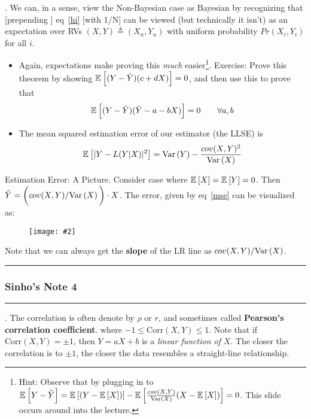 \documentclass[12pt]{article}
\newcommand\myfig[2][0.3\textwidth]{\begin{figure}[h!]\centering\texttt{[image: \#2]}\end{figure}}
\newcommand{\myspace}{\vspace{2\bigskipamount}}
\newcommand\p{\Needspace{12\baselineskip} \noindent}
\begin{document}
\myspace 
\p {}. We can, in a sense, view the Non-Bayesian case as Bayesian by recognizing that [prepending ] eq~\ref{hi} [with 1/N] can be viewed (but technically it isn't) as an expectation over RVs $(X, Y) \triangleq (X_n, Y_n)$ with uniform probability $Pr(X_i, Y_i)$ for all $i$. 
\begin{itemize}
	\item \Theorem[Consider two RVs $X, Y$ with joint $P(X = x, Y = y)$. Then]
	Again, expectations make proving this \emph{much} easier\footnote{Hint: Observe that by plugging in to $\mathbb{E}_{}\left[Y - \hat Y\right] = \mathbb{E}_{}\left[(Y - \mathbb{E}_{}\left[X\right])\right] - \mathbb{E}_{}\left[\frac{cov(X, Y)}{\text{Var}\left(X \right)} (X - \mathbb{E}_{}\left[X\right])\right] = 0$. This slide occurs around \purple{[34:00]} into the lecture. }. Exercise: Prove this theorem by showing $\mathbb{E}_{}\left[(Y - \hat Y)(c + dX)\right] = 0$, and then use this to prove that 
	\begin{align}
		\mathbb{E}_{}\left[(Y - \hat Y)(\hat Y - a - bX)\right] = 0 \qquad \forall a, b
	\end{align} 
	
	
	\item The mean squared estimation error of our estimator (the LLSE) is 
	\begin{align}
		\mathbb{E}_{}\left[ |Y - L(Y|X)|^2 \right] = \text{Var}\left(Y \right) - \frac{cov(X, Y)^2}{\text{Var}\left(X \right)} \label{mse}
	\end{align}
\end{itemize}

\myspace
\p Estimation Error: A Picture. Consider case where $\mathbb{E}_{}\left[X\right] = \mathbb{E}_{}\left[Y\right] = 0$. Then $\hat Y =\bigg( cov(X, Y)/\text{Var}\left(X \right)\bigg) \cdot X$. The error, given by eq~\ref{mse} can be visualized as:\myfig[0.7\textwidth]{TriangleLLSE.PNG}

\p Note that we can always get the \textbf{slope} of the LR line as $cov(X, Y)/\text{Var}\left(X \right)$. 


\myspace
\hrule
\subsubsection{Sinho's Note 4}
\hrule

\myspace
\p {}. The correlation is often denote by $\rho$ or $r$, and sometimes called \textbf{Pearson's correlation coefficient}.
where $-1 \le \text{Corr}(X, Y) \le 1$. Note that if $\text{Corr}(X, Y) = \pm 1$, then $Y = aX + b$ is a \textit{linear function of} $X$. The closer the correlation is to $\pm 1$, the closer the data resembles a straight-line relationship. 
\end{document}

